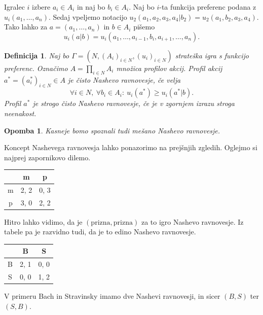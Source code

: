 \documentclass[10pt, a4paper]{article}
\newtheorem{defi}[izr]{Definicija}
\newenvironment{noticeB}{%
  \tcolorbox[%
  notitle,
  empty,
  enhanced,  %
  breakable,
  coltext=black,
  colback=white, 
  fontupper=\rmfamily,
  noparskip,
  sharp corners,
  boxrule=-1pt,  %
  frame hidden,
  left=7pt,  %
  right=7pt,
  top=5pt,
  bottom=5pt,
  before skip=2.5ex plus 2pt,
  after skip=2.5ex plus 2pt,
  borderline west = {1.5pt}{-0.1pt}{blue!30!black}, %
  overlay unbroken and last={%
    \draw[color=black, line width=1.25pt]
    ($(frame.south west)+(1.pt, -0.1pt)$) -- ++(2em, 0);
  }
  ]}
{\endtcolorbox}
\newenvironment{definicija}{\begin{noticeB}\begin{defi}}{%
    \end{defi}\end{noticeB}}
\newtheorem*{opomba}{Opomba}
\begin{document}
Igralec $i$ izbere $a_i \in A_i$ in naj bo $b_i \in A_i$. Naj bo $i$-ta funkcija preferenc podana z $u_i (a_1, \dots, a_n)$.
Sedaj vpeljemo notacijo $u_2 (a_1, a_2, a_3, a_4 | b_2) = u_2 (a_1, b_2, a_3, a_4)$.
Tako lahko za $a = (a_1, \dots, a_n)$ in $b \in A_i$ pišemo $$u_i (a | b) = u_i (a_1, \dots, a_{i - 1}, b_i, a_{i + 1}, \dots, a_n).$$

\begin{definicija}
    Naj bo $\Gamma = (N, (A_i)_{i \in N}, (u_i)_{i \in N})$
    strateška igra s funkcijo preferenc. Označimo $A = \prod_{i \in N}A_i$
    množica profilov akcij. Profil akcij $a^* = (a_i ^*)_{i \in N} \in A$
    je čisto Nashevo ravnovesje, če velja 
    $$\forall i \in N,\ \forall b_i \in A_i:\ u_i (a^*) \geq u_i (a^* | b).$$
    Profil $a^*$ je strogo čisto Nashevo ravnovesje, če je v zgornjem izrazu stroga neenakost.
\end{definicija}

\begin{opomba}
    Kasneje bomo spoznali tudi mešano Nashevo ravnovesje.
\end{opomba}

Koncept Nashevega ravnovesja lahko ponazorimo na prejšnjih zgledih.
Oglejmo si najprej zapornikovo dilemo.

\begin{center}
    {\begin{tabular}{c|c|c|}
        & m & p\\
        \hline
        m & 2, 2 & 0, 3\\
        \hline
        p & 3, 0 & 2, 2\\
        \hline
    \end{tabular}}        
\end{center}

Hitro lahko vidimo, da je $(\mathrm{prizna}, \mathrm{prizna})$ za to igro Nashevo ravnovesje.
Iz tabele pa je razvidno tudi, da je to edino Nashevo ravnovesje.

\begin{center}
    {\begin{tabular}{c|c|c|}
        & B & S\\
        \hline
        B & 2, 1 & 0, 0\\
        \hline
        S & 0, 0 & 1, 2\\
        \hline
    \end{tabular}}        
\end{center}

V primeru Bach in Stravinsky imamo dve Nashevi ravnovesji, in sicer $(B, S)$ ter $(S, B)$.
\end{document}
